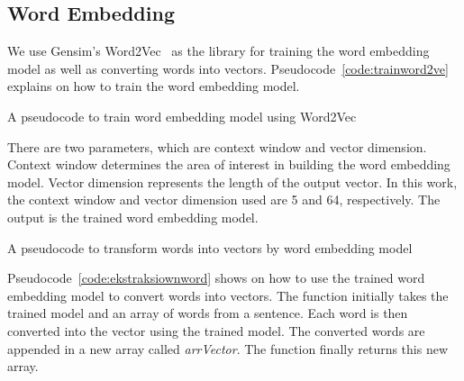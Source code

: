 \subsection{Word Embedding}
We use Gensim's Word2Vec~\citep{gensim} as the library for training the word embedding model as well as converting words into vectors. Pseudocode~\ref{code:trainword2ve} explains on how to train the word embedding model.
\begin{kode}
	
	
	\caption{A pseudocode to train word embedding model using Word2Vec}
	\label{code:trainword2ve}
\end{kode}

There are two parameters, which are context window and vector dimension. Context window determines the area of interest in building the word embedding model. Vector dimension represents the length of the output vector. In this work, the context window and vector dimension used are 5 and 64, respectively. The output is the trained word embedding model.

\begin{kode}
	
	
	\caption{A pseudocode to transform words into vectors by word embedding model}
	\label{code:ekstraksiownword}
\end{kode}
Pseudocode~\ref{code:ekstraksiownword} shows on how to use the trained word embedding model to convert words into vectors. The function initially takes the trained model and an array of words from a sentence. Each word is then converted into the vector using the trained model. The converted words are appended in a new array called \textit{arrVector}. The function finally returns this new array.

